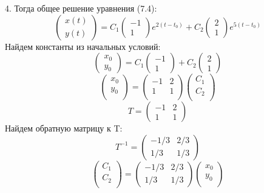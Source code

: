 \documentclass[10pt]{report}
\begin{document}
4. Тогда общее решение уравнения (7.4):
\[\left(
\begin{array}{c}
x(t)\\
y(t)
\end{array}
\right)
=C_1
\left(
\begin{array}{c}
-1\\
1
\end{array}
\right)
e^{2(t-t_0)}+C_2
\left(
\begin{array}{c}
2\\
1
\end{array}
\right)
e^{5(t-t_0)}
\]
Найдем константы из начальных условий:
\[\left(
\begin{array}{c}
x_0\\
y_0
\end{array}
\right)
=C_1
\left(
\begin{array}{c}
-1\\
1
\end{array}
\right)+C_2
\left(
\begin{array}{c}
2\\
1
\end{array}
\right)
\]
\[
\left(
\begin{array}{c}
x_0\\
y_0\\
\end{array}
\right)
 = \left(
\begin{array}{cc}
-1 & 2\\
1 & 1\\
\end{array}
\right)
\left(
\begin{array}{cc}
C_1\\
C_2\\
\end{array}
\right)
\]
\[ T= \left(
\begin{array}{cc}
-1 & 2\\
1 & 1
\end{array}
\right)\]
Найдем обратную матрицу к T:
\[T^{-1}  = \left(
\begin{array}{cc}
-1/3 & 2/3\\
1/3 & 1/3
\end{array}
\right)\]
\[
\left(
\begin{array}{c}
C_1\\
C_2\\
\end{array}
\right)
 = \left(
\begin{array}{cc}
-1/3 & 2/3\\
1/3 & 1/3
\end{array}
\right)
\left(
\begin{array}{cc}
x_0\\
y_0\\
\end{array}
\right)
\]
\end{document}
